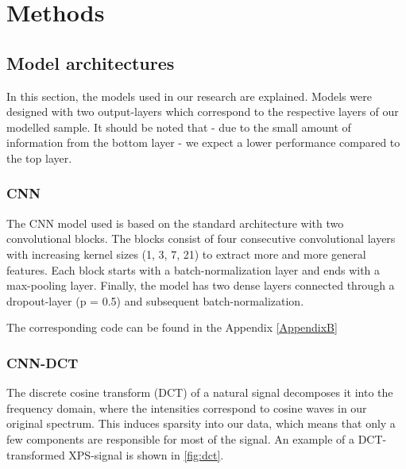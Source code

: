 


\chapter{Methods} %

\label{Chapter3} %







\section{Model architectures}
In this section, the models used in our research are explained. Models were designed with two output-layers which correspond to the respective layers of our modelled sample. It should be noted that - due to the small amount of information from the bottom layer - we expect a lower performance compared to the top layer.

\subsection{CNN}
The CNN model used is based on the standard architecture with two convolutional blocks. The blocks consist of four consecutive convolutional layers with increasing kernel sizes (1, 3, 7, 21) to extract more and more general features. Each block starts with a batch-normalization layer and ends with a max-pooling layer. Finally, the model has two dense layers connected through a dropout-layer (p = 0.5) and subsequent batch-normalization.


The corresponding code can be found in the Appendix \ref{AppendixB}

\subsection{CNN-DCT}
The discrete cosine transform (DCT) of a natural signal decomposes it into the frequency domain, where the intensities correspond to cosine waves in our original spectrum. This induces sparsity into our data, which means that only a few components are responsible for most of the signal. An example of a DCT-transformed XPS-signal is shown in \ref{fig:dct}.

